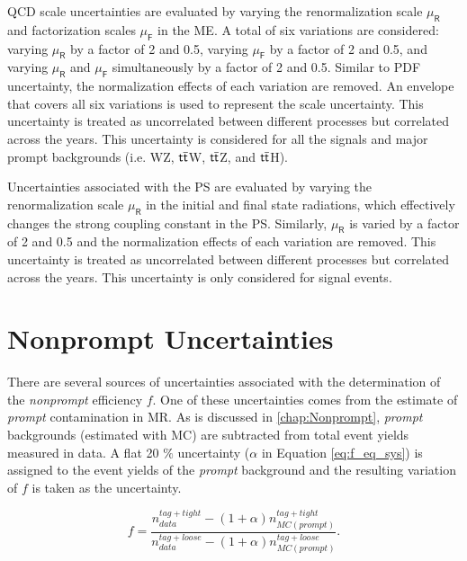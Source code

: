 \ac{QCD} scale uncertainties are evaluated by varying the renormalization scale $\mu_\textsf{R}$ and factorization scales $\mu_\textsf{F}$ in the \ac{ME}. A total of six variations are considered: varying $\mu_\textsf{R}$ by a factor of 2 and 0.5, varying $\mu_\textsf{F}$ by a factor of 2 and 0.5, and varying $\mu_\textsf{R}$ and $\mu_\textsf{F}$ simultaneously by a factor of 2 and 0.5. Similar to \ac{PDF} uncertainty, the normalization effects of each variation are removed. An envelope that covers all six variations is used to represent the scale uncertainty. This uncertainty is treated as uncorrelated between different processes but correlated across the years. This uncertainty is considered for all the signals and major prompt backgrounds (i.e. WZ, $\textsf{t}\overline{\textsf{t}}$W, $\textsf{t}\overline{\textsf{t}}$Z, and $\textsf{t}\overline{\textsf{t}}$H).

Uncertainties associated with the \ac{PS} are evaluated by varying the renormalization scale $\mu_\textsf{R}$ in the initial and final state radiations, which effectively changes the strong coupling constant in the \ac{PS}. Similarly, $\mu_\textsf{R}$ is varied by a factor of 2 and 0.5 and the normalization effects of each variation are removed. This uncertainty is treated as uncorrelated between different processes but correlated across the years. This uncertainty is only considered for signal events.

\section{Nonprompt Uncertainties}
\label{sec:NonUnc}

There are several sources of uncertainties associated with the determination of the \emph{nonprompt} efficiency $f$. One of these uncertainties comes from the estimate of \emph{prompt} contamination in \ac{MR}. As is discussed in \autoref{chap:Nonprompt}, \emph{prompt} backgrounds (estimated with \ac{MC}) are subtracted from total event yields measured in data. A flat 20 $\%$ uncertainty ($\alpha$ in Equation \ref{eq:f_eq_sys}) is assigned to the event yields of the \emph{prompt} background and the resulting variation of $f$ is taken as the uncertainty.

\begin{equation}
f=\frac{n_{data}^{tag+tight}-(1+\alpha)n_{MC(prompt)}^{tag+tight}}{n_{data}^{tag+loose}-(1+\alpha)n_{MC(prompt)}^{tag+loose}}.
\label{eq:f_eq_sys}
\end{equation}  

